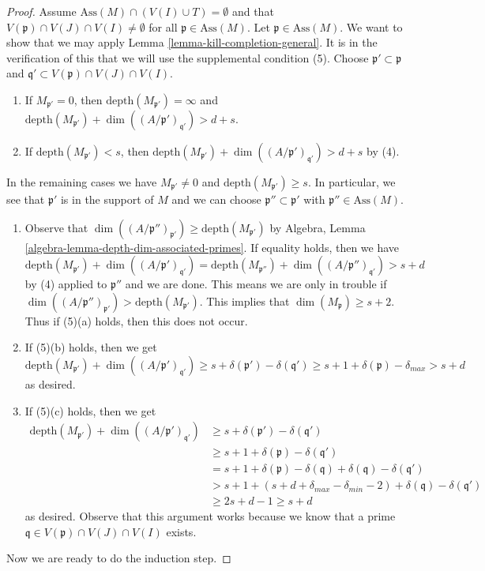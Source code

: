 \documentclass{stacks-project}
\theoremstyle{plain}
\theoremstyle{definition}
\theoremstyle{remark}
\numberwithin{equation}{subsection}
\begin{document}
\begin{proof}
\medskip\noindent
Assume $\text{Ass}(M) \cap (V(I) \cup T) = \emptyset$ and that
$V(\mathfrak p) \cap V(J) \cap V(I) \not = \emptyset$
for all $\mathfrak p \in \text{Ass}(M)$.
Let $\mathfrak p \in \text{Ass}(M)$. We want to show that we may apply
Lemma \ref{lemma-kill-completion-general}.
It is in the verification of this that we will use the supplemental
condition (5). Choose $\mathfrak p' \subset \mathfrak p$
and $\mathfrak q' \subset V(\mathfrak p) \cap V(J) \cap V(I)$.
\begin{enumerate}
\item If $M_{\mathfrak p'} = 0$, then
$\text{depth}(M_{\mathfrak p'}) = \infty$ and
$\text{depth}(M_{\mathfrak p'}) +
\dim((A/\mathfrak p')_{\mathfrak q'}) > d + s$.
\item If $\text{depth}(M_{\mathfrak p'}) < s$, then
$\text{depth}(M_{\mathfrak p'}) +
\dim((A/\mathfrak p')_{\mathfrak q'}) > d + s$ by (4).
\end{enumerate}
In the remaining cases we have $M_{\mathfrak p'} \not = 0$ and
$\text{depth}(M_{\mathfrak p'}) \geq s$. In particular, we see that
$\mathfrak p'$ is in the support of $M$ and we can choose
$\mathfrak p'' \subset \mathfrak p'$ with $\mathfrak p'' \in \text{Ass}(M)$.
\begin{enumerate}
\item[(a)] Observe that
$\dim((A/\mathfrak p'')_{\mathfrak p'}) \geq \text{depth}(M_{\mathfrak p'})$
by Algebra, Lemma \ref{algebra-lemma-depth-dim-associated-primes}.
If equality holds, then we have
$$
\text{depth}(M_{\mathfrak p'}) + \dim((A/\mathfrak p')_{\mathfrak q'}) =
\text{depth}(M_{\mathfrak p''}) + \dim((A/\mathfrak p'')_{\mathfrak q'})
> s + d
$$
by (4) applied to $\mathfrak p''$ and we are done. This means we are
only in trouble if
$\dim((A/\mathfrak p'')_{\mathfrak p'}) > \text{depth}(M_{\mathfrak p'})$.
This implies that $\dim(M_\mathfrak p) \geq s + 2$.
Thus if (5)(a) holds, then this does not occur.
\item[(b)] If (5)(b) holds, then we get
$$
\text{depth}(M_{\mathfrak p'}) + \dim((A/\mathfrak p')_{\mathfrak q'})
\geq s + \delta(\mathfrak p') - \delta(\mathfrak q')
\geq s + 1 + \delta(\mathfrak p) - \delta_{max}
> s + d
$$
as desired.
\item[(c)] If (5)(c) holds, then we get
\begin{align*}
\text{depth}(M_{\mathfrak p'}) + \dim((A/\mathfrak p')_{\mathfrak q'})
& \geq
s + \delta(\mathfrak p') - \delta(\mathfrak q') \\
& \geq
s + 1 + \delta(\mathfrak p) - \delta(\mathfrak q') \\
& =
s + 1 + \delta(\mathfrak p) - \delta(\mathfrak q) +
\delta(\mathfrak q) - \delta(\mathfrak q') \\
& >
s + 1 + (s + d + \delta_{max} - \delta_{min} - 2) +
\delta(\mathfrak q) - \delta(\mathfrak q') \\
& \geq 
2s + d - 1 \geq s + d
\end{align*}
as desired. Observe that this argument works because
we know that a prime $\mathfrak q \in V(\mathfrak p) \cap V(J) \cap V(I)$
exists.
\end{enumerate}
Now we are ready to do the induction step.


\end{proof}
\end{document}
